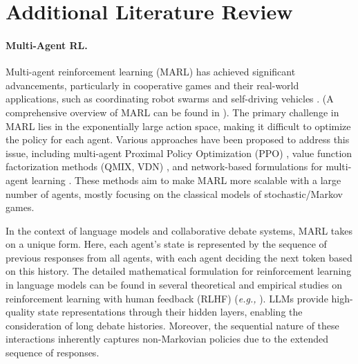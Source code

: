 
\section{Additional Literature Review}
\label{appendix:deferred_literature}
\paragraph{Multi-Agent RL. }
Multi-agent reinforcement learning (MARL) has achieved significant advancements, particularly in cooperative games and their real-world applications, such as coordinating robot swarms \citep{huttenrauch2017guided} and self-driving vehicles \citep{shalev2016safe}. (A comprehensive overview of MARL can be found in \citep{zhang2021multi}).  The primary challenge in MARL lies in the exponentially large action space, making it difficult to optimize the policy for each agent. Various approaches have been proposed to address this issue, including multi-agent Proximal Policy Optimization (PPO) \citep{yu2022surprising}, value function factorization methods (QMIX, VDN) \citep{rashid2020monotonic, sunehag2017value}, and network-based formulations for multi-agent learning \citep{park2024multi}. These methods aim to make MARL more scalable with a large number of agents, mostly focusing on the classical models of stochastic/Markov games. 


In the context of language models and collaborative debate systems, MARL takes on a unique form. Here, each agent's state is represented by the sequence of previous responses from all agents, with each agent deciding the next token based on this history. The detailed mathematical formulation for reinforcement learning in language models can be found in several theoretical and empirical studies on reinforcement learning with human feedback (RLHF) (\textit{e.g.,} \citep{ouyang2022training, zhu2023principled, park2024principled}). LLMs provide high-quality state representations through their hidden layers, enabling the consideration of long debate histories. Moreover, the sequential nature of these interactions inherently captures non-Markovian policies due to the extended sequence of responses. 

